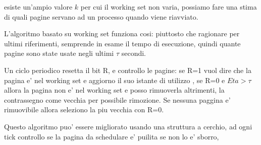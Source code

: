         esiste un'ampio valore $k$ per cui il working set non varia, possiamo fare una stima di quali pagine
        servano ad un processo quando viene riavviato.

        L'algoritmo basato su working set funziona cosi: piuttosto che ragionare per ultimi riferimenti, semprende
        in esame il tempo di esecuzione, quindi quante pagine sono state usate negli ultimi $\tau$ secondi.

        Un ciclo periodico resetta il bit R, e controllo le pagine: se R=1 vuol dire che la pagina e' nel working set e aggiorno il suo istante di utilizzo
        , se R=0 e $Eta>\tau$ allora la pagina non e' nel working set e posso rimuoverla altrimenti, la contrassegno come vecchia per possibile rimozione.
        Se nessuna paggina e' rimuovibile allora seleziono la piu vecchia con R=0.

        Questo algoritmo puo' essere migliorato usando una struttura a cerchio, ad ogni tick controllo se la pagina da schedulare e' puilita
        se non lo e' sborro,